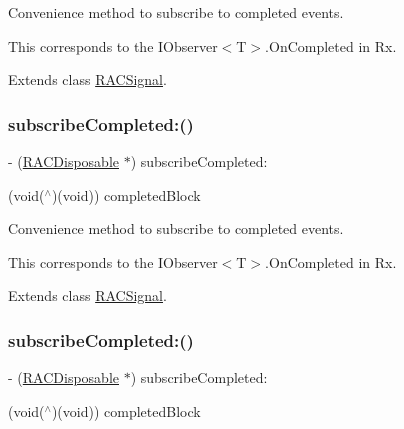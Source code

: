 Convenience method to subscribe to {\ttfamily completed} events.

This corresponds to the {\ttfamily I\+Observer$<$T$>$.On\+Completed} in Rx. 

Extends class \mbox{\hyperlink{interface_r_a_c_signal_a3927c94bfca5db9dad133dd7c45563f3}{R\+A\+C\+Signal}}.

\mbox{\label{category_r_a_c_signal_07_subscription_08_a3927c94bfca5db9dad133dd7c45563f3}} 
\subsubsection{\texorpdfstring{subscribe\+Completed\+:()}{subscribeCompleted:()}\hspace{0.1cm}{\footnotesize\ttfamily [2/3]}}
{\footnotesize\ttfamily -\/ (\mbox{\hyperlink{interface_r_a_c_disposable}{R\+A\+C\+Disposable}} $\ast$) subscribe\+Completed\+: \begin{DoxyParamCaption}\item[{(void($^\wedge$)(void))}]{completed\+Block }\end{DoxyParamCaption}}

Convenience method to subscribe to {\ttfamily completed} events.

This corresponds to the {\ttfamily I\+Observer$<$T$>$.On\+Completed} in Rx. 

Extends class \mbox{\hyperlink{interface_r_a_c_signal_a3927c94bfca5db9dad133dd7c45563f3}{R\+A\+C\+Signal}}.

\mbox{\label{category_r_a_c_signal_07_subscription_08_a3927c94bfca5db9dad133dd7c45563f3}} 
\subsubsection{\texorpdfstring{subscribe\+Completed\+:()}{subscribeCompleted:()}\hspace{0.1cm}{\footnotesize\ttfamily [3/3]}}
{\footnotesize\ttfamily -\/ (\mbox{\hyperlink{interface_r_a_c_disposable}{R\+A\+C\+Disposable}} $\ast$) subscribe\+Completed\+: \begin{DoxyParamCaption}\item[{(void($^\wedge$)(void))}]{completed\+Block }\end{DoxyParamCaption}}

